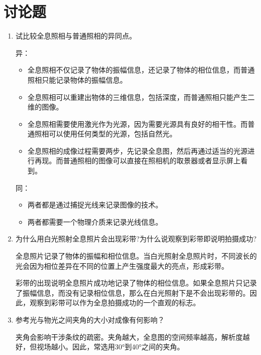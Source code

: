 \documentclass[signature=preparation]{physicsreport}
\begin{document}
\section{讨论题}
\begin{enumerate}
    \item 试比较全息照相与普通照相的异同点。

    异：\begin{itemize}
        \item 全息照相不仅记录了物体的振幅信息，还记录了物体的相位信息，而普通照相只能记录物体的振幅信息。
        \item 全息照相可以重建出物体的三维信息，包括深度，而普通照相只能产生二维的图像。
        \item 全息照相需要使用激光作为光源，因为需要光源具有良好的相干性。而普通照相可以使用任何类型的光源，包括自然光。
        \item 全息照相的成像过程需要两步，先记录全息图，然后再通过适当的光源进行再现。而普通照相的图像可以直接在照相机的取景器或者显示屏上看到。
    \end{itemize}

    同：\begin{itemize}
        \item 两者都是通过捕捉光线来记录图像的技术。
        \item 两者都需要一个物理介质来记录光线信息。
    \end{itemize}

    \item 为什么用白光照射全息照片会出现彩带?为什么说观察到彩带即说明拍摄成功?
    
    \hspace*{2em}
    全息照片记录了物体的振幅和相位信息。当白光照射全息照片时，不同波长的光会因为相位差异在不同的位置上产生强度最大的亮点，形成彩带。

    \hspace*{2em}
    彩带的出现说明全息照片成功地记录了物体的相位信息。如果全息照片只记录了振幅信息，而没有记录相位信息，那么在白光照射下是不会出现彩带的。因此，观察到彩带可以作为全息拍摄成功的一个直观的标志。

    \item 参考光与物光之间夹角的大小对成像有何影响？
    
    \hspace*{2em}
    夹角会影响干涉条纹的疏密。夹角越大，全息图的空间频率越高，解析度越好，但视场越小。因此，常选用30°到40°之间的夹角。

\end{enumerate}
\end{document}
